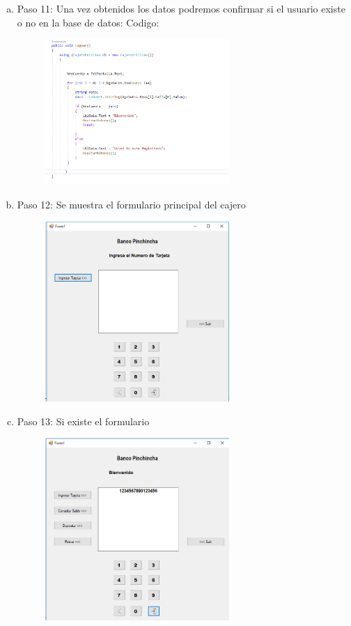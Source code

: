 \begin{enumerate}[1.]
\begin{enumerate}[a)]
\begin{figure}[H]
		\end{figure}
	\item Paso 11: Una vez obtenidos los datos podremos confirmar si el usuario existe o no en la base de datos:
		Codigo:
		\begin{figure}[H]
		\begin{center}
		\includegraphics[width=7cm]{./Imagenes/img12}
		\end{center}
		\end{figure}
	\item Paso 12: Se muestra el formulario principal del cajero
		\begin{figure}[H]
		\begin{center}
		\includegraphics[width=7cm]{./Imagenes/img13}
		\end{center}
		\end{figure}
	\item Paso 13: Si existe el formulario
		\begin{figure}[H]
		\begin{center}
		\includegraphics[width=7cm]{./Imagenes/img14}

\end{center}
\end{figure}
\end{enumerate}
\end{enumerate}
